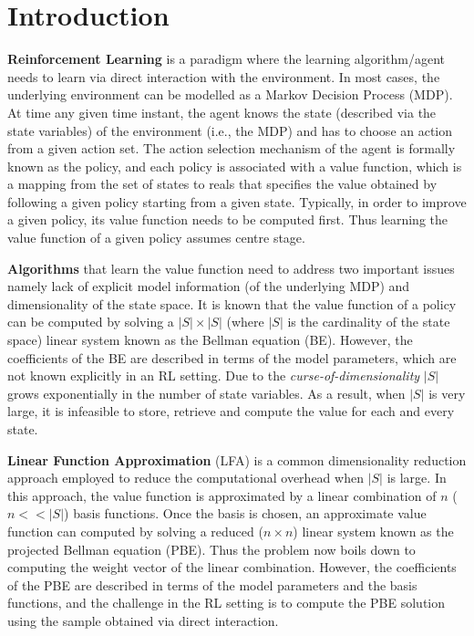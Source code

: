\section{Introduction}
\textbf{Reinforcement Learning} is a paradigm where the learning algorithm/agent needs to learn via direct interaction with the environment. In most cases, the underlying environment can be modelled as a Markov Decision Process (MDP). At time any given time instant, the agent knows the state (described via the state variables) of the environment (i.e., the MDP) and has to choose an action from a given action set. The action selection mechanism of the agent is formally known as the policy, and each policy is associated with a value function, which is a mapping from the set of states to reals that specifies the value obtained by following a given policy starting from a given state. Typically, in order to improve a given policy, its value function needs to be computed first. Thus learning the value function of a given policy assumes centre stage.\par
\textbf{Algorithms} that learn the value function need to address two important issues namely lack of explicit model information (of the underlying MDP) and dimensionality of the state space. It is known that the value function of a policy can be computed by solving a $|S|\times|S|$ (where $|S|$ is the cardinality of the state space) linear system known as the Bellman equation (BE). However, the coefficients of the BE are described in terms of the model parameters, which are not known explicitly in an RL setting. Due to the \emph{curse-of-dimensionality} $|S|$ grows exponentially in the number of state variables. As a result, when $|S|$ is very large, it is infeasible to store, retrieve and compute the value for each and every state.\par
\textbf{Linear Function Approximation} (LFA) is a common dimensionality reduction approach employed to reduce the computational overhead when $|S|$ is large. In this approach, the value function is approximated by a linear combination of $n$ ($n<<|S|$) basis functions. Once the basis is chosen, an approximate value function can computed by solving a reduced ($n\times n$) linear system known as the projected Bellman equation (PBE). Thus the problem now boils down to computing the weight vector of the linear combination. However, the coefficients of the PBE are described in terms of the model parameters and the basis functions, and the challenge in the RL setting is to compute the PBE solution using the sample obtained via direct interaction.\par
